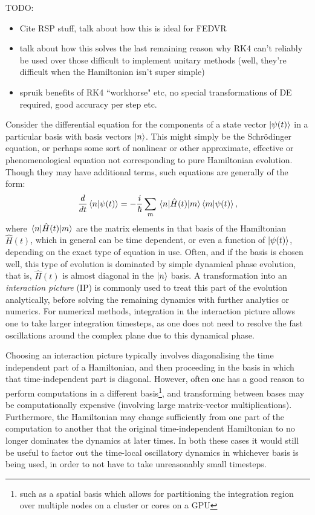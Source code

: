 TODO:
\begin{itemize}
\item Cite RSP stuff, talk about how this is ideal for FEDVR
\item talk about how this solves the last remaining reason why RK4 can't reliably be used over those difficult to implement unitary methods (well, they're difficult when the Hamiltonian isn't super simple)
\item spruik benefits of RK4 ``workhorse" etc, no special transformations of DE required, good accuracy per step etc.
\end{itemize}

Consider the differential equation for the components of a state vector $\ket{\psi(t)}$ in a particular basis with basis vectors $\ket{n}$. This might simply be the Schrödinger equation, or perhaps some sort of nonlinear or other approximate, effective or phenomenological equation not corresponding to pure Hamiltonian evolution. Though they may have additional terms, such equations are generally of the form:
\begin{align}\label{eq:real_imag}
\frac{d}{dt} \braket{n}{\psi(t)} = -\frac i \hbar \sum_m \matrixel{n}{\hat H(t)}{m} \braket{m}{\psi(t)},
\end{align}
where $\matrixel{n}{\hat H(t)}{m}$ are the matrix elements in that basis of the Hamiltonian $\hat H(t)$, which in general can be time dependent, or even a function of $\ket{\psi(t)}$, depending on the exact type of equation in use. Often, and if the basis is chosen well, this type of evolution is dominated by simple dynamical phase evolution, that is, $\hat H(t)$ is almost diagonal in the $\ket{n}$ basis. A transformation into an \emph{interaction picture} (IP) is commonly used to treat this part of the evolution analytically, before solving the remaining dynamics with further analytics or numerics. For numerical methods, integration in the interaction picture allows one to take larger integration timesteps, as one does not need to resolve the fast oscillations around the complex plane due to this dynamical phase.

Choosing an interaction picture typically involves diagonalising the time independent part of a Hamiltonian, and then proceeding in the basis in which that time-independent part is diagonal. However, often one has a good reason to perform computations in a different basis\footnote{such as a spatial basis which allows for partitioning the integration region over multiple nodes on a cluster or cores on a GPU}, and transforming between bases may be computationally expensive (involving large matrix-vector multiplications). Furthermore, the Hamiltonian may change sufficiently from one part of the computation to another that the original time-independent Hamiltonian to no longer dominates the dynamics at later times. In both these cases it would still be useful to factor out the time-local oscillatory dynamics in whichever basis is being used, in order to not have to take unreasonably small timesteps.

